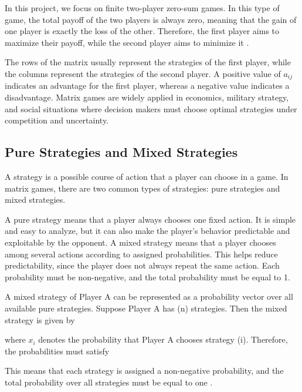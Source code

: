 \documentclass[12pt,a4paper]{article}
\begin{document}
In this project, we focus on finite two-player zero-sum games. In this type of game, the total payoff of the two players is always zero, meaning that the gain of one player is exactly the loss of the other. Therefore, the first player aims to maximize their payoff, while the second player aims to minimize it \cite{osborne2004}.

The rows of the matrix usually represent the strategies of the first player, while the columns represent the strategies of the second player. A positive value of \(a_{ij}\) indicates an advantage for the first player, whereas a negative value indicates a disadvantage. Matrix games are widely applied in economics, military strategy, and social situations where decision makers must choose optimal strategies under competition and uncertainty.

\subsection{Pure Strategies and Mixed Strategies}

A strategy is a possible course of action that a player can choose in a game. In matrix games, there are two common types of strategies: pure strategies and mixed strategies.

A pure strategy means that a player always chooses one fixed action. It is simple and easy to analyze, but it can also make the player's behavior predictable and exploitable by the opponent. A mixed strategy means that a player chooses among several actions according to assigned probabilities. This helps reduce predictability, since the player does not always repeat the same action. Each probability must be non-negative, and the total probability must be equal to 1.

A mixed strategy of Player A can be represented as a probability vector over all available pure strategies. Suppose Player A has (n) strategies. Then the mixed strategy is given by

\noindent{}

where \(x_i\) denotes the probability that Player A chooses strategy (i). Therefore, the probabilities must satisfy

\noindent{} 

\vspace{0.1CM}
This means that each strategy is assigned a non-negative probability, and the total probability over all strategies must be equal to one \cite{karlin1959}.
\end{document}
